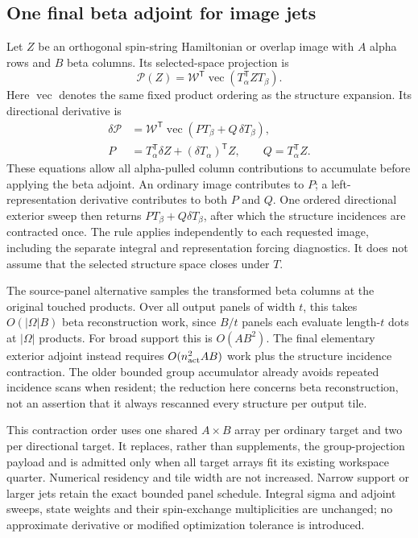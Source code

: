 \documentclass[11pt,a4paper]{article}
\newcommand{\Tr}{^{\mathsf T}}
\newcommand{\Wa}{\mathcal W}
\begin{document}
\subsection{One final beta adjoint for image jets}
\label{sec:final-beta-adjoint}

Let $Z$ be an orthogonal spin-string Hamiltonian or overlap image with
$A$ alpha rows and $B$ beta columns. Its selected-space projection is
\begin{equation}
 \mathcal P(Z)=\Wa\Tr\operatorname{vec}(T_\alpha\Tr ZT_\beta).
 \label{eq:image-projection}
\end{equation}
Here $\operatorname{vec}$ denotes the same fixed product ordering as the
structure expansion. Its directional derivative is
\begin{align}
 \delta\mathcal P
 &=\Wa\Tr\operatorname{vec}(P T_\beta+Q\,\delta T_\beta),\\
 P&=T_\alpha\Tr\delta Z+(\delta T_\alpha)\Tr Z,
 \qquad Q=T_\alpha\Tr Z.
 \label{eq:image-projection-jet}
\end{align}
These equations allow all alpha-pulled column contributions to accumulate
before applying the beta adjoint. An ordinary image contributes to $P$;
a left-representation derivative contributes to both $P$ and $Q$.
One ordered directional exterior sweep then returns
$P T_\beta+Q\delta T_\beta$, after which the structure incidences are
contracted once. The rule applies independently to each requested image,
including the separate integral and representation forcing diagnostics.
It does not assume that the selected structure space closes under $T$.

The source-panel alternative samples the transformed beta columns at the
original touched products. Over all output panels of width $t$, this takes
$O(|\Omega|B)$ beta reconstruction work, since $B/t$ panels each evaluate
length-$t$ dots at $|\Omega|$ products. For broad support this is $O(AB^2)$.
The final elementary exterior adjoint instead requires
$O(n_{\rm act}^2 AB)$ work plus the structure incidence contraction.
The older bounded group accumulator already avoids repeated incidence
scans when resident; the reduction here concerns beta reconstruction,
not an assertion that it always rescanned every structure per output tile.

This contraction order uses one shared $A\times B$ array per ordinary
target and two per directional target. It replaces, rather than supplements,
the group-projection payload and is admitted only when all target arrays fit
its existing workspace quarter. Numerical residency and tile width are not
increased. Narrow support or larger jets retain the exact bounded panel
schedule. Integral sigma and adjoint sweeps, state weights and their
spin-exchange multiplicities are unchanged; no approximate derivative or
modified optimization tolerance is introduced.
\end{document}
